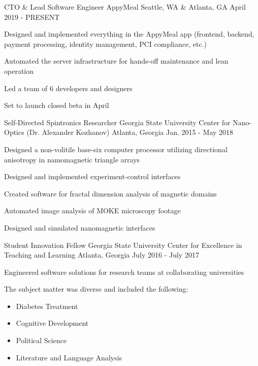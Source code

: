 \begin{cventries}

\cventry
{CTO \& Lead Software Engineer} %
{AppyMeal} %
{Seattle, WA \& Atlanta, GA} %
{April 2019 - PRESENT} %
{ %
\begin{cvitems}
\item {Designed and implemented everything in the AppyMeal app (frontend, backend, payment processing, \newline identity management, PCI compliance, etc.)}
\item {Automated the server infrastructure for hands-off maintenance and lean operation}
\item {Led a team of 6 developers and designers}
\item {Set to launch closed beta in April}
\end{cvitems}
}


\cventry
{Self-Directed Spintronics Researcher} %
{Georgia State University Center for Nano-Optics (Dr. Alexander Kozhanov)} %
{Atlanta, Georgia} %
{Jan. 2015 - May 2018} %
{ %
\begin{cvitems}
\item {Designed a non-volitile base-six computer processor utilizing directional anisotropy in namomagnetic \newline triangle arrays}
\item {Designed and implemented experiment-control interfaces}
\item {Created software for fractal dimension analysis of magnetic domains}
\item {Automated image analysis of MOKE microscopy footage}
\item {Designed and simulated nanomagnetic interfaces}
\end{cvitems} 
}


\cventry
{Student Innovation Fellow} %
{Georgia State University Center for Excellence in Teaching and Learning} %
{Atlanta, Georgia} %
{July 2016 - July 2017} %
{ %
\begin{cvitems}
\item {Engineered software solutions for research teams at collaborating universities}
\item {The subject matter was diverse and included the following:}
\begin{itemize}
\item{Diabetes Treatment}
\item{Cognitive Development}
\item{Political Science}
\item{Literature and Language Analysis}
\end{itemize}
\end{cvitems}
}


\end{cventries}
